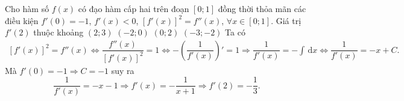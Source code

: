 \begin{ex}%
	Cho hàm số $ f(x)$ có đạo hàm cấp hai trên đoạn $\left[0;1\right]$ đồng thời thỏa mãn các điều kiện $f'(0)=-1$, $f'(x)<0$, $\left[f'(x)\right]^2=f''(x)$, $\forall x\in\left[0;1\right]$. Giá trị $ f'(2)$ thuộc khoảng
	\choice
	{$(2;3)$}
	{\True $(-2;0)$}
	{$(0;2)$}
	{$(-3;-2)$}
	\loigiai
	{
		Ta có
		\begin{align*}
			\left[f'(x)\right]^2=f''(x) \Leftrightarrow\dfrac{f''(x)}{\left[f'(x)\right]^2}=1\Leftrightarrow-\left(\dfrac{1}{f'(x)}\right)'=1\Rightarrow\dfrac{1}{f'(x)}=-\displaystyle\int{\mathrm{\,d} x} \Leftrightarrow\dfrac{1}{f'(x)}=-x+C.
		\end{align*}
		Mà $f'(0)=-1\Rightarrow C=-1$ suy ra
		$$\dfrac{1}{f'(x)}=-x-1\Rightarrow f'(x)=-\dfrac{1}{x+1} \Rightarrow{f}'(2)=-\dfrac{1}{3}.$$
	}
\end{ex}

